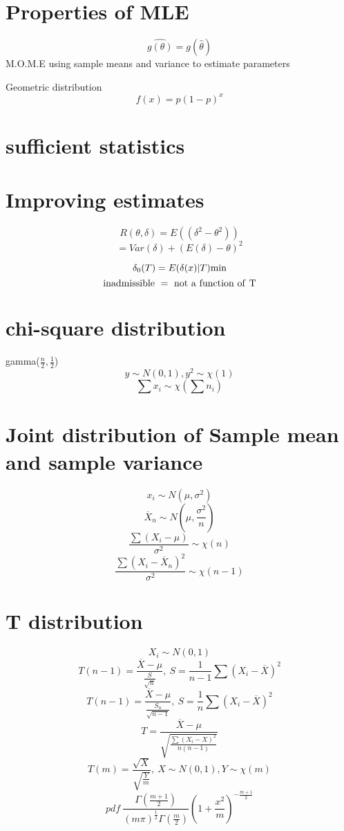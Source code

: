 \documentclass[12pt, a4paper, twocolumn]{article}
\begin{document}
\section*{Properties of MLE}
$$\widehat{g(\theta)} = g(\widehat{\theta})$$
M.O.M.E using sample means and variance to estimate parameters 


Geometric distribution 
$$f(x) = p(1 - p)^x$$

\section*{sufficient statistics}
\section*{Improving estimates}
$$R(\theta, \delta) = E((\delta^2 - \theta^2)) $$
$$= Var(\delta) + (E(\delta) - \theta)^2$$
 
$$\delta_0(T) = E(\delta(x)|T) \rm{ min }$$
$$\rm{inadmissible\ = \ not\ a\ function\ of\ T}$$

\section*{chi-square distribution}

gamma($\frac{n}{2}, \frac{1}{2}$)
$$y \sim N(0, 1), y^2 \sim \chi(1)$$
$$\sum x_i \sim \chi(\sum n_i)$$

\section*{Joint distribution of Sample mean and sample variance}
$$x_i \sim N(\mu, \sigma^2)$$
$$\overline{X}_n \sim N(\mu, \frac{\sigma^2}{n})$$
$$\frac{\sum (X_i - \mu)}{\sigma^2} \sim \chi(n)$$
$$\frac{\sum (X_i - \overline{X}_n)^2}{\sigma^2} \sim \chi(n - 1)$$

\section*{T distribution}
$$X_i \sim N(0, 1)$$
$$T(n - 1) = \frac{\overline{X} - \mu}{\frac{S}{\sqrt{n}}},\ S = \frac{1}{n - 1}\sum (X_i - \overline{X})^2$$
$$T(n - 1) = \frac{\overline{X} - \mu}{\frac{S_n}{\sqrt{n - 1}}},\ S = \frac{1}{n}\sum(X_i - \overline{X})^2$$
$$T = \frac{\overline{X} - \mu}{\sqrt{\frac{\sum(X_i - X)^2}{n(n - 1)}}}$$
$$T(m) = \frac{\sqrt{X}}{{\sqrt{\frac{Y}{m}}}},\ X\sim N(0, 1), Y \sim \chi(m)$$
$$pdf\ \frac{\Gamma(\frac{m + 1}{2})}{(m\pi)^{\frac{1}{2}}\Gamma(\frac{m}{2})}(1 + \frac{x^2}{m})^{-\frac{m + 1}{2}}$$
\end{document}

